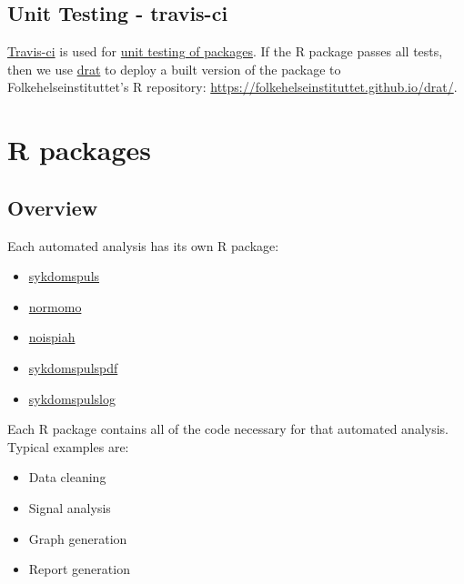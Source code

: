 \documentclass[12pt,]{article}
\providecommand{\tightlist}{%
  \setlength{\itemsep}{0pt}\setlength{\parskip}{0pt}}
\begin{document}
\subsection{Unit Testing - travis-ci}\label{travis}

\href{http://travis-ci.org/folkehelseinstituttet}{Travis-ci} is used for
\href{http://r-pkgs.had.co.nz/check.html\#travis}{unit testing of
packages}. If the R package passes all tests, then we use
\href{https://github.com/eddelbuettel/drat}{drat} to deploy a built
version of the package to Folkehelseinstituttet's R repository:
\url{https://folkehelseinstituttet.github.io/drat/}.

\section{R packages}\label{rpackages}

\subsection{Overview}\label{overview}

Each automated analysis has its own R package:

\begin{itemize}
\tightlist
\item
  \href{https://folkehelseinstituttet.github.io/dashboards_sykdomspuls/}{sykdomspuls}
\item
  \href{https://folkehelseinstituttet.github.io/dashboards_normomo/}{normomo}
\item
  \href{https://folkehelseinstituttet.github.io/dashboards_noispiah/}{noispiah}
\item
  \href{https://folkehelseinstituttet.github.io/dashboards_sykdomspuls_pdf/}{sykdomspulspdf}
\item
  \href{https://folkehelseinstituttet.github.io/dashboards_sykdomspuls_log/}{sykdomspulslog}
\end{itemize}

Each R package contains all of the code necessary for that automated
analysis. Typical examples are:

\begin{itemize}
\tightlist
\item
  Data cleaning
\item
  Signal analysis
\item
  Graph generation
\item
  Report generation
\end{itemize}
\end{document}
